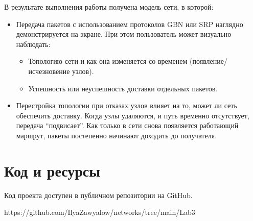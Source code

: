 \documentclass[a4paper,14pt]{extarticle}
\begin{document}
В результате выполнения работы получена модель сети, в которой:
\begin{itemize}
    \item Передача пакетов с использованием протоколов GBN или SRP наглядно демонстрируется на экране. При этом пользователь может визуально наблюдать:
    \begin{itemize}
        \item Топологию сети и как она изменяется со временем (появление/исчезновение узлов).
        \item Успешность или неуспешность доставки отдельных пакетов.
    \end{itemize}
    \item Перестройка топологии при отказах узлов влияет на то, может ли сеть обеспечить доставку. Когда узлы удаляются, и путь временно отсутствует, передача “подвисает”. Как только в сети снова появляется работающий маршрут, пакеты постепенно начинают доходить до получателя.
\end{itemize}


\section{Код и ресурсы}
Код проекта доступен в публичном репозитории на GitHub.

https://github.com/IlyaZawyalow/networks/tree/main/Lab3
\end{document}
